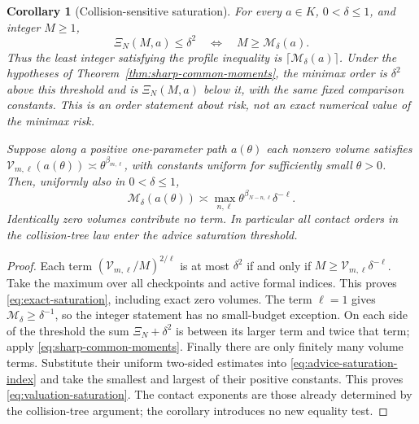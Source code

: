 \documentclass[11pt]{amsart}
\newtheorem{corollary}[theorem]{Corollary}
\theoremstyle{definition}\newtheorem{definition}[theorem]{Definition}
\theoremstyle{remark}\newtheorem{remark}[theorem]{Remark}
\begin{document}
\begin{corollary}[Collision-sensitive saturation]
\label{cor:advice-saturation}
For every $a\in K$, $0<\delta\le1$, and integer $M\ge1$,
\begin{equation}\label{eq:exact-saturation}
 \Xi_N(M,a)\le\delta^2
       \quad\Longleftrightarrow\quad M\ge\mathcal M_\delta(a).
\end{equation}
Thus the least integer satisfying the profile inequality is
$\lceil\mathcal M_\delta(a)\rceil$. Under the hypotheses of
Theorem~\ref{thm:sharp-common-moments}, the minimax order is $\delta^2$
above this threshold and is $\Xi_N(M,a)$ below it, with the same fixed
comparison constants. This is an order statement about risk, not an
exact numerical value of the minimax risk.

Suppose along a positive one-parameter path $a(\theta)$ each nonzero
volume satisfies
$\mathcal V_{m,\ell}(a(\theta))\asymp\theta^{\beta_{m,\ell}}$,
with constants uniform for sufficiently small $\theta>0$.
Then, uniformly also in $0<\delta\le1$,
\begin{equation}\label{eq:valuation-saturation}
 \mathcal M_\delta(a(\theta))\asymp
 \max_{n,\ell}\theta^{\beta_{N-n,\ell}}\delta^{-\ell}.
\end{equation}
Identically zero volumes contribute no term. In particular all contact
orders in the collision-tree law enter the advice saturation threshold.
\end{corollary}
\begin{proof}
Each term $(\mathcal V_{m,\ell}/M)^{2/\ell}$ is at most
$\delta^2$ if and only if $M\ge\mathcal V_{m,\ell}\delta^{-\ell}$.
Take the maximum over all checkpoints and active formal indices.
This proves \eqref{eq:exact-saturation}, including exact zero volumes.
The term $\ell=1$ gives $\mathcal M_\delta\ge\delta^{-1}$, so the
integer statement has no small-budget exception. On each side of the
threshold the sum $\Xi_N+\delta^2$ is between its larger term and
twice that term; apply \eqref{eq:sharp-common-moments}.
Finally there are only finitely many volume terms. Substitute their
uniform two-sided estimates into \eqref{eq:advice-saturation-index}
and take the smallest and largest of their positive constants.
This proves \eqref{eq:valuation-saturation}. The contact exponents
are those already determined by the collision-tree argument; the
corollary introduces no new equality test.
\end{proof}
\end{document}
